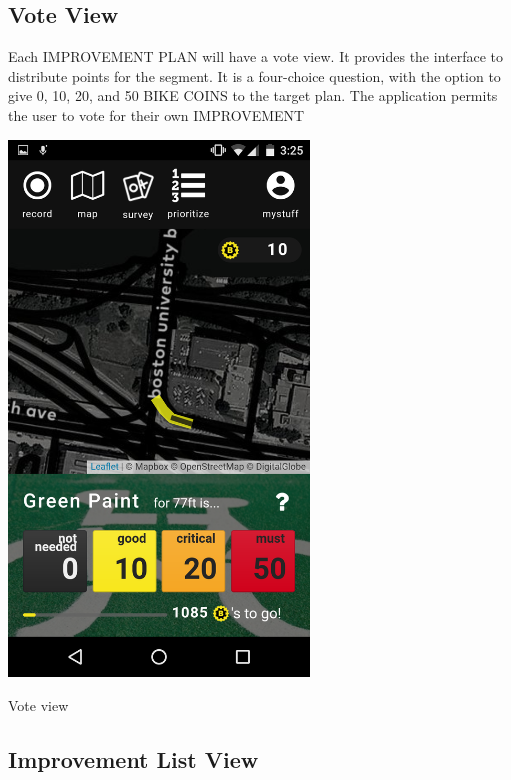 \subsection{Vote View}

Each IMPROVEMENT PLAN will have a vote view. It provides the interface to distribute points for the segment. It is a four-choice question, with the option to give 0, 10, 20, and 50 BIKE COINS to the target plan. The application permits the user to vote for their own IMPROVEMENT

\begin{marginfigure}
  \includegraphics[width=0.6\textwidth]{chapters/4/fig/interface_vote.png}               
  \caption[interface: Vote]{Vote view}
  \label{fig:interface_vote}
\end{marginfigure}

\subsection{Improvement List View}

